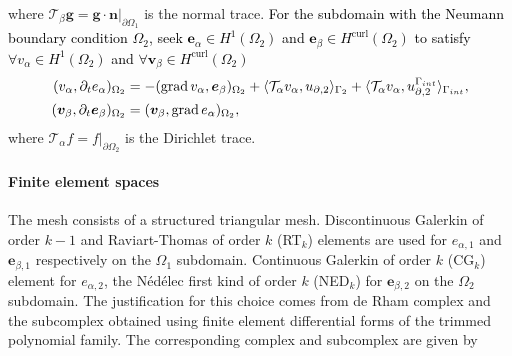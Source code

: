 \documentclass[11pt,a4paper]{article}
\DeclareMathOperator*{\grad}{grad}
\renewcommand{\div}{\operatorname{div}}
\DeclareMathOperator*{\curl}{curl}
\newcommand{\innerproduct}[3][\Omega]{(#2, #3)_{#1}}
\newcommand{\boundary}[3][\partial\Omega]{\langle #2, #3\rangle_{#1}}
\newcommand{\revtwo}[1]{{\textcolor{black}{#1}}}
\begin{document}
where $\mathcal{T}_\beta \bm{g} = \bm{g} \cdot \bm{n}|_{\partial\Omega_1}$ is the normal trace. \revtwo{For the subdomain with the Neumann boundary condition $\Omega_2$, seek $\bm{e}_\alpha\in H^1(\Omega_2)$ and $\bm{e}_\beta\in H^{\curl}(\Omega_2)$ to satisfy $\forall{v}_\alpha\in H^1(\Omega_2)$ and $\forall\bm{v}_\beta\in H^{\curl}(\Omega_2)$}
\begin{equation}
    \begin{split}
    \begin{alignedat}{2}
        \innerproduct[\Omega_2]{{v}_\alpha}{\partial_t{e}_\alpha} &= -\innerproduct[\Omega_2]{\grad{v}_\alpha}{\bm{e}_\beta} + \boundary[\Gamma_2]{\mathcal{T}_{\alpha}v_\alpha}{{u}_{\partial,2}} + \boundary[\Gamma_{\rm int}]{\mathcal{T}_{\alpha}{v}_\alpha}{{u}_{\partial,2}^{\Gamma_{\rm int}}}, \\
        \innerproduct[\Omega_2]{\bm{v}_\beta}{\partial_t\bm{e}_\beta} &= \innerproduct[\Omega_2]{\bm{v}_\beta}{\grad {e}_\alpha},
    \end{alignedat}
    \end{split}
\label{eq:Wave-weak-N}
\end{equation}
where $\mathcal{T}_\alpha f = f|_{\partial\Omega_2}$ is the Dirichlet trace. 
\paragraph{Finite element spaces} The mesh consists of a structured triangular mesh. Discontinuous Galerkin of order $k-1$ and Raviart-Thomas of order $k$ (RT$_k$) elements are used for $e_{\alpha, 1}$ and $\bm{e}_{\beta, 1}$ respectively on the $\Omega_1$ subdomain. Continuous Galerkin of order $k$ (CG$_k$) element for $e_{\alpha, 2}$, the N\'ed\'elec first kind of order $k$ (NED$_k$) for $\bm{e}_{\beta, 2}$ on the $\Omega_2$ subdomain.  The justification for this choice comes from de Rham complex and the subcomplex obtained using finite element differential forms of the trimmed polynomial family. The corresponding complex and subcomplex are given by

\begin{minipage}[t]{0.45\textwidth}
\begin{center}
\end{center}
\end{minipage} 
\begin{minipage}[t]{0.45\textwidth}
\begin{center}
\end{center}
\end{minipage}
\end{document}
